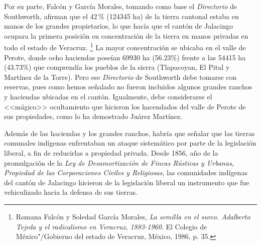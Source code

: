 \documentclass[14pt,twoside,final]{extbook} %
\let\oldfootnote\footnote
\renewcommand\footnote[1]{%
\oldfootnote{\hspace{1mm}#1}}
\begin{document}
Por su parte, Falcón y García Morales, tomando como base el \emph{Directorio} de Southworth, afirman que el 42\,\% (124345 ha) de la tierra cantonal estaba en manos de los grandes propietarios, lo que hacía que el cantón de Jalacingo ocupara la primera posición en concentración de la tierra en manos privadas en todo el estado de Veracruz.\footnote{Romana Falcón y Soledad García Morales, \emph{La semilla en el surco. Adalberto Tejeda y el radicalismo en Veracruz, 1883-1960}. El Colegio de México"/Gobierno del estado de Veracruz, México, 1986, p. 35.} La mayor concentración se ubicaba en el valle de Perote, donde ocho haciendas poseían 69930 ha (56.23\%) frente a las 54415 ha (43.73\%) que comprendía los pueblos de la sierra (Tlapacoyan, El Pital y Martínez de la Torre). Pero ese \emph{Directorio} de Southworth debe tomarse con reservas, pues como hemos señalado no
fueron incluidos algunos grandes ranchos y haciendas ubicadas en el cantón. Igualmente, debe considerarse el <<mágico>> ocultamiento que hicieron los hacendados del valle de Perote de sus propiedades, como lo ha demostrado Juárez Martínez.

Además de las haciendas y los grandes ranchos, habría que señalar que las tierras comunales indígenas enfrentaban un ataque sistemático por parte de la legislación liberal, a fin de reducirlas a propiedad privada. Desde 1856, año de la promulgación de la \emph{Ley de Desamortización de Fincas Rústicas y Urbanas, Propiedad de las Corporaciones Civiles y Religiosas}, las comunidades indígenas del cantón de Jalacingo hicieron de la legislación liberal un instrumento que fue vehiculizado hacia la defensa de sus tierras.
\end{document}
